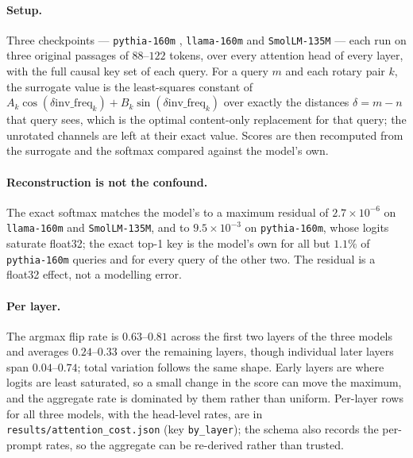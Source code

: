 \documentclass{article}
\theoremstyle{plain}
\theoremstyle{remark}
\newcommand{\invf}{\mathrm{inv\_freq}}
\begin{document}
\paragraph{Setup.} Three checkpoints --- \texttt{pythia-160m} \citep{biderman2023pythia},
\texttt{llama-160m} \citep{touvron2023llama} and \texttt{SmolLM-135M} --- each
run on three original passages of $88$--$122$ tokens, over every attention head
of every layer, with the full causal key set of each query. For a query $m$ and
each rotary pair $k$, the surrogate value is the least-squares constant of
$A_k\cos(\delta\invf_k) + B_k\sin(\delta\invf_k)$ over exactly the distances
$\delta = m - n$ that query sees, which is the optimal content-only replacement
for that query; the unrotated channels are left at their exact value. Scores are
then recomputed from the surrogate and the softmax compared against the model's
own.

\paragraph{Reconstruction is not the confound.} The exact softmax matches the
model's to a maximum residual of $2.7\times10^{-6}$ on \texttt{llama-160m} and
\texttt{SmolLM-135M}, and to $9.5\times10^{-3}$ on \texttt{pythia-160m}, whose
logits saturate float32; the exact top-1 key is the
model's own for all but $1.1\%$ of \texttt{pythia-160m} queries and for every
query of the other two. The residual is a float32 effect, not a modelling error.

\paragraph{Per layer.} The argmax flip rate is $0.63$--$0.81$ across the first
two layers of the three models and averages $0.24$--$0.33$ over the remaining
layers, though individual later layers span $0.04$--$0.74$; total variation
follows the same shape. Early layers are where logits are least
saturated, so a small change in the score can move the maximum, and the aggregate
rate is dominated by them rather than uniform. Per-layer rows for all three
models, with the head-level rates, are in \texttt{results/attention\_cost.json}
(key \texttt{by\_layer}); the schema also records the per-prompt rates, so the
aggregate can be re-derived rather than trusted.
\end{document}
